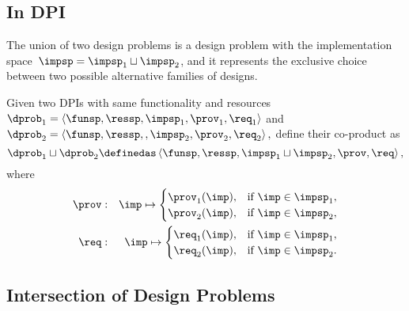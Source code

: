 \subsection{In DPI}\label{subsec:dpi-union}


The union of two design problems is a design problem with the implementation
space~$\impsp=\impsp_{1}\sqcup\impsp_{2}$, and it represents the
exclusive choice between two possible alternative families of designs.
\begin{definition}[Co-product]
  \label{def:parallel-1}Given two DPIs with same functionality and
  resources $\dprob_{1}=\left\langle \funsp,\ressp,\impsp_{1},\prov_{1},\req_{1}\right\rangle $
  and $\dprob_{2}=\left\langle \funsp,\ressp,,\impsp_{2},\prov_{2},\req_{2}\right\rangle ,$
  define their co-product as
  \[
    \dprob_{1}\sqcup\dprob_{2}\definedas\left\langle \funsp,\ressp,\impsp_{1}\sqcup\impsp_{2},\prov,\req\right\rangle ,
  \]
  where
  \begin{eqnarray}
    \prov & : & \imp\mapsto\begin{cases}
                             \prov_{1}(\imp), & \text{if }\imp\in\impsp_{1},\\
                             \prov_{2}(\imp), & \text{if }\imp\in\impsp_{2},
    \end{cases}\label{eq:dppar-exec-1}\\
    \req & : & \imp\mapsto\begin{cases}
                            \req_{1}(\imp), & \text{if }\imp\in\impsp_{1},\\
                            \req_{2}(\imp), & \text{if }\imp\in\impsp_{2}.
    \end{cases}\nonumber
  \end{eqnarray}
\end{definition}




\begin{figure}[h!]
    \centering
    \caption{\label{fig:dpcoproduct}}
\end{figure}

\subsection{Intersection of Design Problems}


